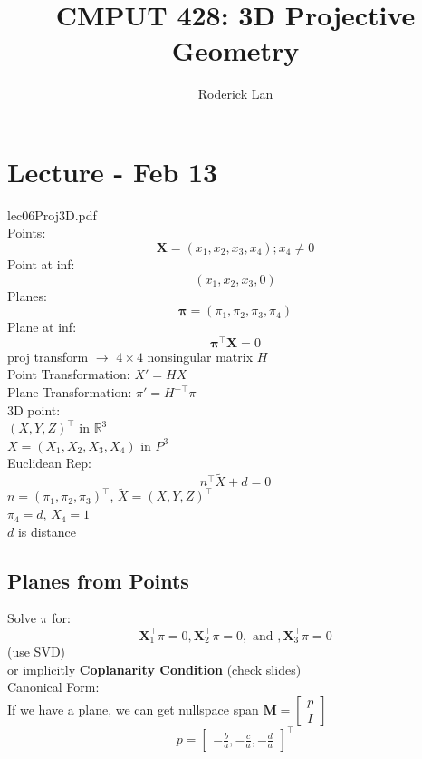 \documentclass{article}
\title{CMPUT 428: 3D Projective Geometry}
\author{Roderick Lan}
\date{}
\begin{document}
\makeatother
{}

\maketitle
\tableofcontents
\break

\section{Lecture - Feb 13}
lec06Proj3D.pdf\\[5pt]
Points:
\[
  \mathbf X = (x_1, x_2, x_3, x_4); x_4 \ne 0
\]
Point at inf:
\[
  (x_1, x_2, x_3, 0)
\]
Planes:
\[
  \mathbf \pi = (\pi_1, \pi_2, \pi_3, \pi_4)
\]
Plane at inf:
\[
  \mathbf \pi^\top \mathbf X = 0
\]
proj transform $\to$ $4\times 4$ nonsingular matrix $H$\\
Point Transformation: $X' = HX$
\\
Plane Transformation: $\pi' =H^{-\top }\pi$
\\[5pt]
3D point:\\
$(X,Y,Z)^\top$ in $\mathbb R^3$
\\
$X = (X_1, X_2, X_3, X_4)$ in $P^3$
\\[5pt]
Euclidean Rep:
\[
  n^\top \tilde X + d = 0
\]
$
n = (\pi_1, \pi_2, \pi_3)^\top
$, $\tilde X = (X,Y,Z)^\top $
\\
$\pi_4 = d$, $X_4 = 1$
\\
$d$ is distance
\subsection{Planes from Points}
Solve $\pi$ for:
\[
  \mathbf X_1^\top \pi = 0, \mathbf X_2^\top \pi = 0, \text{ and }, \mathbf X_3^\top \pi = 0
\]
(use SVD)\\
or implicitly \textbf{Coplanarity Condition} (check slides)
\\[5pt]
Canonical Form:
\\
If we have a plane, we can get nullspace span $\mathbf M= \begin{bmatrix}
  p \\ I
\end{bmatrix}$ 
\[
  p = \begin{bmatrix}
    -\frac{b}{a}, -\frac{c}{a}, -\frac{d}{a}
  \end{bmatrix}^\top
\]
\end{document}
